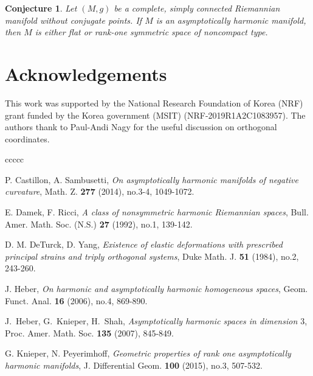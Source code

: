 \documentclass[12pt,a4paper]{amsart}
\newtheorem*{Con*}{Conjecture}
\theoremstyle{definition}
\theoremstyle{remark}
\newcommand \<{\langle}
\renewcommand \>{\rangle}
\begin{document}
\begin{Con*}
    Let $(M,g)$ be a complete, simply connected Riemannian
manifold without conjugate points. If $M$ is an asymptotically harmonic manifold, then $M$ is either flat or rank-one symmetric space of noncompact type.
\end{Con*}



\section*{Acknowledgements}
This work was supported by the National Research Foundation of Korea (NRF) grant funded by the Korea government (MSIT) (NRF-2019R1A2C1083957). The authors thank to Paul-Andi Nagy for the useful discussion on orthogonal coordinates.


\begin{thebibliography}{ccccc}


P. Castillon, A. Sambusetti, \textit{On asymptotically harmonic manifolds of negative curvature}, Math. Z. {\bf 277} (2014), no.3-4, 1049-1072.

E. Damek, F. Ricci, \textit{A class of nonsymmetric harmonic Riemannian spaces}, Bull. Amer. Math. Soc. (N.S.) {\bf 27} (1992), no.1, 139-142.

D. M. DeTurck, D. Yang, \textit{Existence of elastic deformations with prescribed principal strains and triply orthogonal systems}, Duke Math. J. {\bf 51} (1984), no.2, 243-260.

J. Heber, \textit{On harmonic and asymptotically harmonic homogeneous spaces}, Geom. Funct. Anal. {\bf 16} (2006), no.4, 869-890.

J.~Heber, G.~Knieper, H.~Shah,
\textit{Asymptotically harmonic spaces in dimension $3$}, Proc. Amer. Math. Soc. {\bf 135} (2007), 845-849.


G. Knieper, N. Peyerimhoff, \textit{Geometric properties of rank one asymptotically harmonic manifolds}, J. Differential Geom. {\bf 100} (2015), no.3, 507-532.


\end{thebibliography}
\end{document}
